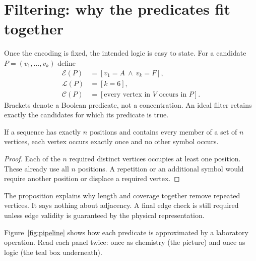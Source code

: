 \section{Filtering: why the predicates fit together}\label{sec:filter}
Once the encoding is fixed, the intended logic is easy to state. For a candidate
$P=(v_1,\ldots,v_k)$ define
\[
 \begin{aligned}
 \mathcal E(P)&=[v_1=A\ \land\ v_k=F],\\
 \mathcal L(P)&=[k=6],\\
 \mathcal C(P)&=[\text{every vertex in }V\text{ occurs in }P].
 \end{aligned}
\]
Brackets denote a Boolean predicate, not a concentration. An ideal filter retains
exactly the candidates for which its predicate is true.

\begin{proposition}
If a sequence has exactly $n$ positions and contains every member of a set of $n$
vertices, each vertex occurs exactly once and no other symbol occurs.
\end{proposition}
\begin{proof}
Each of the $n$ required distinct vertices occupies at least one position. These
already use all $n$ positions. A repetition or an additional symbol would require
another position or displace a required vertex.
\end{proof}
The proposition explains why length and coverage together remove repeated
vertices. It says nothing about adjacency. A final edge check is still required
unless edge validity is guaranteed by the physical representation.

Figure~\ref{fig:pipeline} shows how each predicate is approximated by a
laboratory operation. Read each panel twice: once as chemistry (the picture) and
once as logic (the teal box underneath).


